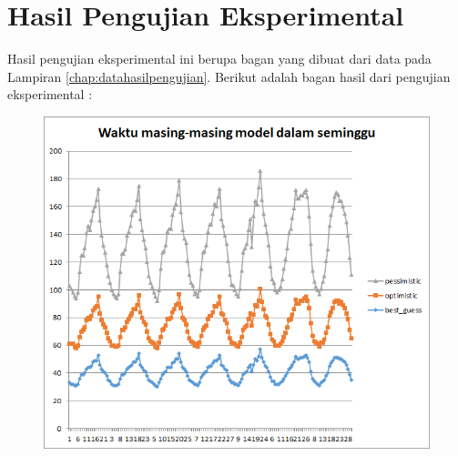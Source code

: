 \chapter{Hasil Pengujian Eksperimental}
\label{chap:hasilpengujianeksperimental}

Hasil pengujian eksperimental ini berupa bagan yang dibuat dari data pada Lampiran \ref{chap:datahasilpengujian}. Berikut adalah bagan hasil dari pengujian eksperimental :

\begin{figure}[H]
				\centering		
				\includegraphics[scale=0.8]{Gambar/waktuallmodelsampel108052017.png}
\end{figure}
			

